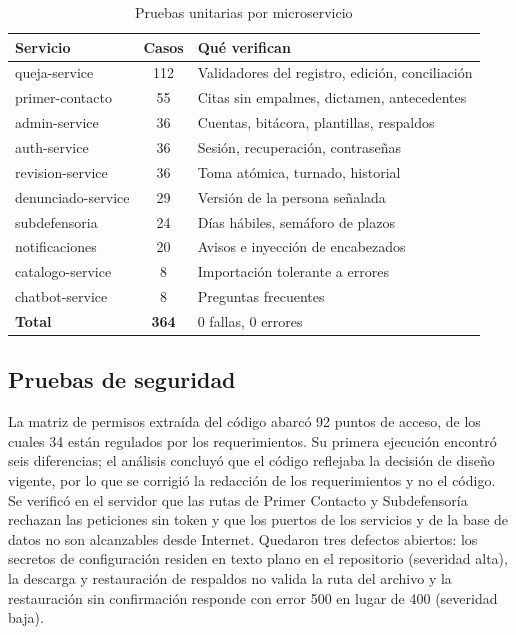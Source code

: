 \documentclass[conference,letterpaper]{IEEEtran}
\begin{document}
\begin{table}[t]
\caption{Pruebas unitarias por microservicio}
\label{tab:unitarias}
\centering
\renewcommand{\arraystretch}{1.15}
\begin{tabular}{|l|c|p{3.6cm}|}
\hline
\textbf{Servicio} & \textbf{Casos} & \textbf{Qué verifican} \\ \hline
queja-service & 112 & Validadores del registro, edición, conciliación \\ \hline
primer-contacto & 55 & Citas sin empalmes, dictamen, antecedentes \\ \hline
admin-service & 36 & Cuentas, bitácora, plantillas, respaldos \\ \hline
auth-service & 36 & Sesión, recuperación, contraseñas \\ \hline
revision-service & 36 & Toma atómica, turnado, historial \\ \hline
denunciado-service & 29 & Versión de la persona señalada \\ \hline
subdefensoria & 24 & Días hábiles, semáforo de plazos \\ \hline
notificaciones & 20 & Avisos e inyección de encabezados \\ \hline
catalogo-service & 8 & Importación tolerante a errores \\ \hline
chatbot-service & 8 & Preguntas frecuentes \\ \hline
\textbf{Total} & \textbf{364} & 0 fallas, 0 errores \\ \hline
\end{tabular}
\end{table}

\subsection{Pruebas de seguridad}

La matriz de permisos extraída del código abarcó 92 puntos de acceso, de los cuales 34 están regulados por los requerimientos. Su primera ejecución encontró seis diferencias; el análisis concluyó que el código reflejaba la decisión de diseño vigente, por lo que se corrigió la redacción de los requerimientos y no el código. Se verificó en el servidor que las rutas de Primer Contacto y Subdefensoría rechazan las peticiones sin token y que los puertos de los servicios y de la base de datos no son alcanzables desde Internet. Quedaron tres defectos abiertos: los secretos de configuración residen en texto plano en el repositorio (severidad alta), la descarga y restauración de respaldos no valida la ruta del archivo y la restauración sin confirmación responde con error 500 en lugar de 400 (severidad baja).
\end{document}
